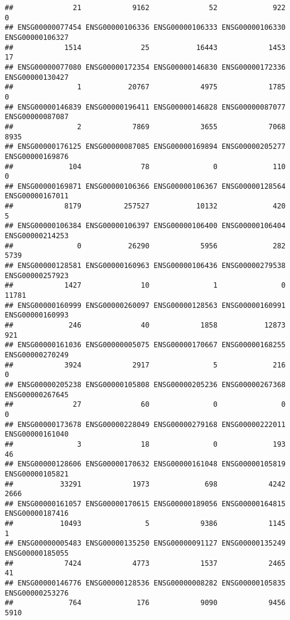 \documentclass[
]{article}
\begin{document}
\begin{verbatim}
##              21            9162              52             922               0 
## ENSG00000077454 ENSG00000106336 ENSG00000106333 ENSG00000106330 ENSG00000106327 
##            1514              25           16443            1453              17 
## ENSG00000077080 ENSG00000172354 ENSG00000146830 ENSG00000172336 ENSG00000130427 
##               1           20767            4975            1785               0 
## ENSG00000146839 ENSG00000196411 ENSG00000146828 ENSG00000087077 ENSG00000087087 
##               2            7869            3655            7068            8935 
## ENSG00000176125 ENSG00000087085 ENSG00000169894 ENSG00000205277 ENSG00000169876 
##             104              78               0             110               0 
## ENSG00000169871 ENSG00000106366 ENSG00000106367 ENSG00000128564 ENSG00000167011 
##            8179          257527           10132             420               5 
## ENSG00000106384 ENSG00000106397 ENSG00000106400 ENSG00000106404 ENSG00000214253 
##               0           26290            5956             282            5739 
## ENSG00000128581 ENSG00000160963 ENSG00000106436 ENSG00000279538 ENSG00000257923 
##            1427              10               1               0           11781 
## ENSG00000160999 ENSG00000260097 ENSG00000128563 ENSG00000160991 ENSG00000160993 
##             246              40            1858           12873             921 
## ENSG00000161036 ENSG00000005075 ENSG00000170667 ENSG00000168255 ENSG00000270249 
##            3924            2917               5             216               0 
## ENSG00000205238 ENSG00000105808 ENSG00000205236 ENSG00000267368 ENSG00000267645 
##              27              60               0               0               0 
## ENSG00000173678 ENSG00000228049 ENSG00000279168 ENSG00000222011 ENSG00000161040 
##               3              18               0             193              46 
## ENSG00000128606 ENSG00000170632 ENSG00000161048 ENSG00000105819 ENSG00000105821 
##           33291            1973             698            4242            2666 
## ENSG00000161057 ENSG00000170615 ENSG00000189056 ENSG00000164815 ENSG00000187416 
##           10493               5            9386            1145               1 
## ENSG00000005483 ENSG00000135250 ENSG00000091127 ENSG00000135249 ENSG00000185055 
##            7424            4773            1537            2465              41 
## ENSG00000146776 ENSG00000128536 ENSG00000008282 ENSG00000105835 ENSG00000253276 
##             764             176            9090            9456            5910 

\end{verbatim}
\end{document}
